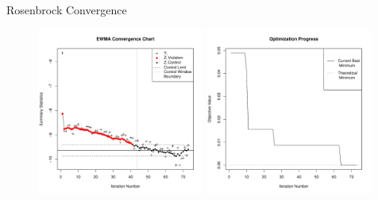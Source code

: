 \documentclass[ xcolor = pdftex, dvipsnames, table ]{beamer}
\begin{document}
%
%

\begin{frame}{Rosenbrock Convergence}
\begin{figure}[h!]%
	\includegraphics[width=0.49\textwidth]{ewmaConvChartRoseEasyEasyEnd.pdf}
        \includegraphics[width=0.49\textwidth]{bestZRoseEasyEasyEnd.pdf}
\end{figure}
\end{frame}
\end{document}
